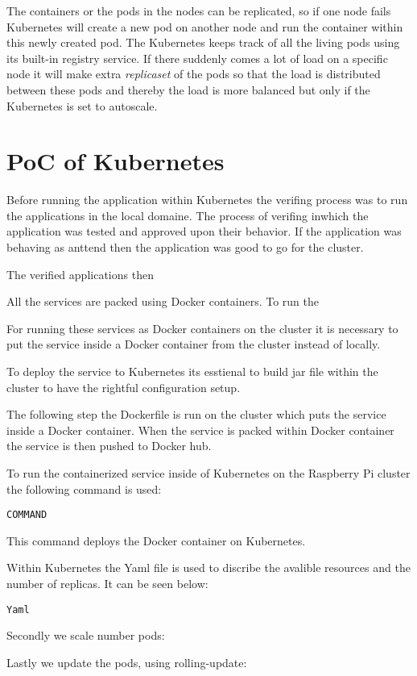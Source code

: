The containers or the pods in the nodes can be replicated, so if one node fails Kubernetes will create a new pod on another node and run the container within this newly created pod. The Kubernetes keeps track of all the living pods using its built-in registry service.  
If there suddenly comes a lot of load on a specific node it will make extra \emph{replicaset} of the pods so that the load is distributed between these pods and thereby the load is more balanced but only if the Kubernetes is set to autoscale. 

\section{PoC of Kubernetes}

Before running the application within Kubernetes the verifing process was to run the applications in the local domaine. The process of verifing inwhich the application was tested and approved upon their behavior. If the application was behaving as anttend then the application was good to go for the cluster. 


The verified applications then 


All the services are packed using Docker containers. To run the  

For running these services as Docker containers on the cluster it is necessary to put the service inside a Docker container from the cluster instead of locally.

To deploy the service to Kubernetes its esstienal to build jar file within the cluster to have the rightful configuration setup.

The following step the Dockerfile is run on the cluster which puts the service inside a Docker container. When the service is packed within Docker container the service is then pushed to Docker hub.   

To run the containerized service inside of Kubernetes on the Raspberry Pi cluster the following command is used:

\begin{lstlisting}
COMMAND 
\end{lstlisting}

This command deploys the Docker container on Kubernetes. 

Within Kubernetes the Yaml file is used to discribe the avalible resources and the number of replicas. It can be seen below:

\begin{lstlisting}
Yaml
\end{lstlisting}


Secondly we scale number pods:

Lastly we update the pods, using rolling-update:





